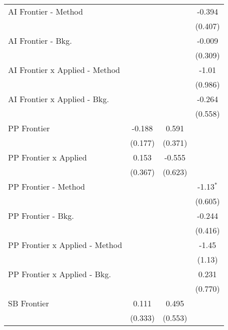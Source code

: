 \begin{tabular}{lccc}
   AI Frontier - Method           &               &               & -0.394\\   
                                  &               &               & (0.407)\\   
   AI Frontier - Bkg.             &               &               & -0.009\\   
                                  &               &               & (0.309)\\   
   AI Frontier x Applied - Method &               &               & -1.01\\   
                                  &               &               & (0.986)\\   
   AI Frontier x Applied - Bkg.   &               &               & -0.264\\   
                                  &               &               & (0.558)\\   
   PP Frontier                    & -0.188        & 0.591         &   \\   
                                  & (0.177)       & (0.371)       &   \\   
   PP Frontier x Applied          & 0.153         & -0.555        &   \\   
                                  & (0.367)       & (0.623)       &   \\   
   PP Frontier - Method           &               &               & -1.13$^{*}$\\   
                                  &               &               & (0.605)\\   
   PP Frontier - Bkg.             &               &               & -0.244\\   
                                  &               &               & (0.416)\\   
   PP Frontier x Applied - Method &               &               & -1.45\\   
                                  &               &               & (1.13)\\   
   PP Frontier x Applied - Bkg.   &               &               & 0.231\\   
                                  &               &               & (0.770)\\   
   SB Frontier                    & 0.111         & 0.495         &   \\   
                                  & (0.333)       & (0.553)       &   \\   

\end{tabular}
